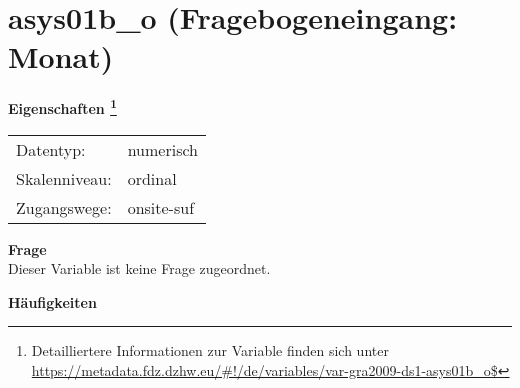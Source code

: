 
    \setcounter{footnote}{0}

    \vspace*{-1.8cm}
	\section{asys01b\_o (Fragebogeneingang: Monat)}
	\label{section:asys01b_o}



    \vspace*{0.5cm}
    \noindent\textbf{Eigenschaften
	\footnote{Detailliertere Informationen zur Variable finden sich unter
		\url{https://metadata.fdz.dzhw.eu/\#!/de/variables/var-gra2009-ds1-asys01b_o$}}}\\
	\begin{tabularx}{\hsize}{@{}lX}
	Datentyp: & numerisch \\
	Skalenniveau: & ordinal \\
	Zugangswege: &
	  onsite-suf
 \\
    \end{tabularx}



		\vspace*{0.5cm}
		\noindent\textbf{Frage}\\
		Dieser Variable ist keine Frage zugeordnet.





        		\vspace*{0.5cm}
                \noindent\textbf{Häufigkeiten}

